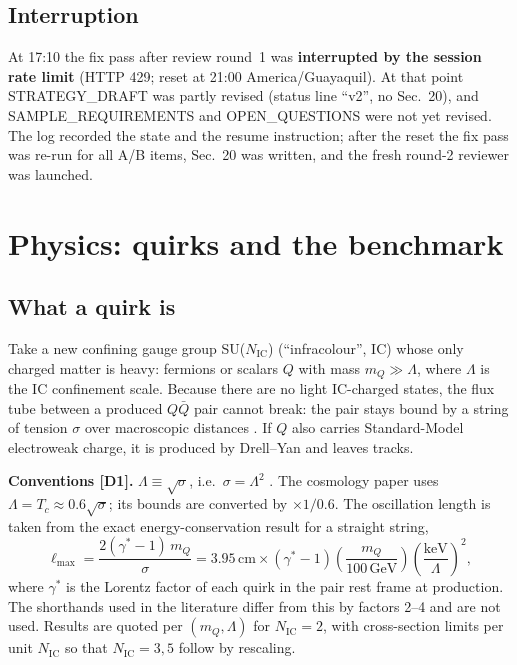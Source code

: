 \documentclass[11pt,a4paper]{article}
\newcommand{\mQ}{m_Q}
\newcommand{\NIC}{N_{\mathrm{IC}}}
\newcommand{\GeV}{\,\mathrm{GeV}}
\begin{document}
\subsection{Interruption}
At 17:10 the fix pass after review round~1 was \textbf{interrupted by the session rate limit} (HTTP 429; reset at 21:00 America/Guayaquil). At that point STRATEGY\_DRAFT was partly revised (status line ``v2'', no Sec.~20), and SAMPLE\_REQUIREMENTS and OPEN\_QUESTIONS were not yet revised. The log recorded the state and the resume instruction; after the reset the fix pass was re-run for all A/B items, Sec.~20 was written, and the fresh round-2 reviewer was launched. 
\section{Physics: quirks and the benchmark}\label{sec:physics}
\subsection{What a quirk is}
Take a new confining gauge group SU($\NIC$) (``infracolour'', IC) whose only charged matter is heavy: fermions or scalars $Q$ with mass $\mQ\gg\Lambda$, where $\Lambda$ is the IC confinement scale. Because there are no light IC-charged states, the flux tube between a produced $Q\bar Q$ pair cannot break: the pair stays bound by a string of tension $\sigma$ over macroscopic distances \cite{KL}. If $Q$ also carries Standard-Model electroweak charge, it is produced by Drell--Yan and leaves tracks.

\textbf{Conventions [D1].} $\Lambda\equiv\sqrt{\sigma}$, i.e.\ $\sigma=\Lambda^2$ \cite{Knapen}. The cosmology paper \cite{cool} uses $\Lambda=T_c\approx0.6\sqrt\sigma$; its bounds are converted by $\times1/0.6$. The oscillation length is taken from the exact energy-conservation result for a straight string,
\begin{equation}
\ell_{\max}=\frac{2(\gamma^*-1)\,\mQ}{\sigma}=3.95\,\mathrm{cm}\times(\gamma^*-1)\left(\frac{\mQ}{100\GeV}\right)\left(\frac{\mathrm{keV}}{\Lambda}\right)^{2},
\end{equation}
where $\gamma^*$ is the Lorentz factor of each quirk in the pair rest frame at production. The shorthands used in the literature differ from this by factors 2--4 and are not used. Results are quoted per $(\mQ,\Lambda)$ for $\NIC=2$, with cross-section limits per unit $\NIC$ so that $\NIC=3,5$ follow by rescaling.
\end{document}
